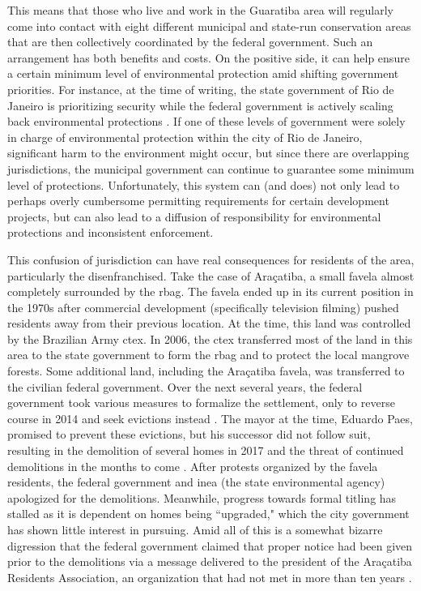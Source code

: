This means that those who live and work in the Guaratiba area will regularly come into contact with eight different municipal and state-run conservation areas that are then collectively coordinated by the federal government. Such an arrangement has both benefits and costs. On the positive side, it can help ensure a certain minimum level of environmental protection amid shifting government priorities. For instance, at the time of writing, the state government of Rio de Janeiro is prioritizing security \cite{kaiserRioGovernorConfirms2019} while the federal government is actively scaling back environmental protections \cite{simoesBrazilBolsonaroEnvironment2019}. If one of these levels of government were solely in charge of environmental protection within the city of Rio de Janeiro, significant harm to the environment might occur, but since there are overlapping jurisdictions, the municipal government can continue to guarantee some minimum level of protections. Unfortunately, this system can (and does) not only lead to perhaps overly cumbersome permitting requirements for certain development projects, but can also lead to a diffusion of responsibility for environmental protections and inconsistent enforcement. 
 
This confusion of jurisdiction can have real consequences for residents of the area, particularly the disenfranchised. Take the case of Araçatiba, a small favela almost completely surrounded by the \ac{rbag}. The favela ended up in its current position in the 1970s after commercial development (specifically television filming) pushed residents away from their previous location. At the time, this land was controlled by the Brazilian Army \ac{ctex}. In 2006, the \ac{ctex} transferred most of the land in this area to the state government to form the \ac{rbag} and to protect the local mangrove forests. Some additional land, including the Araçatiba favela, was transferred to the civilian federal government. Over the next several years, the federal government took various measures to formalize the settlement, only to reverse course in 2014 and seek evictions instead \cite{chisholmWhoInvadingWhom2017}. The mayor at the time, Eduardo Paes, promised to prevent these evictions, but his successor did not follow suit, resulting in the demolition of several homes in 2017 and the threat of continued demolitions in the months to come \cite{stroblSOSAracatibaCommunity2018}. After protests organized by the favela residents, the federal government and \ac{inea} (the state environmental agency) apologized for the demolitions. Meanwhile, progress towards formal titling has stalled as it is dependent on homes being ``upgraded," which the city government has shown little interest in pursuing. Amid all of this is a somewhat bizarre digression that the federal government claimed that proper notice had been given prior to the demolitions via a message delivered to the president of the Araçatiba Residents Association, an organization that had not met in more than ten years \cite{stroblFourCoreCriticisms2018}. 

